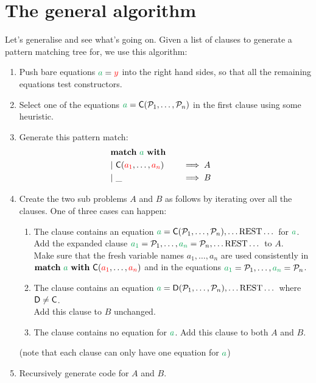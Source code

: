 \documentclass[a4paper, 11pt]{article}
\theoremstyle{definition}
\begin{document}
\section{The general algorithm}

Let's generalise and see what's going on. Given a list of clauses to generate a pattern matching tree for, we use this algorithm:

\begin{enumerate}
  \item Push bare equations $\ba = \fvar y$ into the right hand sides, so that all the remaining equations test constructors.
  \item Select one of the equations $\ba = \C(\pat_1, \dots, \pat_n)$ in the first clause using some heuristic.
  \item Generate this pattern match:
  \begin{alignat*}{4}
    \matchwith{\ba} \\
    \clause{\C(\fvar{a_1}, \dots, \fvar{a_n})}{A} \\
    \clause{\_}{B}
  \end{alignat*}
  \item Create the two sub problems $A$ and $B$ as follows by iterating over all the clauses. One of three cases can happen:
  \begin{enumerate}
    \item The clause contains an equation $\ba = \C(\pat_1, \dots, \pat_n), \dots \text{REST} \dots$ for $\ba$. \\
          Add the expanded clause $\bvar{a_1} = \pat_1, \dots, \bvar{a_n} = \pat_n, \dots \text{REST} \dots$ to $A$. \\
          Make sure that the fresh variable names $a_1,\dots,a_n$ are used consistently in \\
          $\mathbf{match}\ \ba\ \mathbf{with}\ \C(\fvar{a_1}, \dots, \fvar{a_n})$ and in the equations $\bvar{a_1} = \pat_1, \dots, \bvar{a_n} = \pat_n$.
    \item The clause contains an equation $\ba = \mathsf{D}(\pat_1, \dots, \pat_n), \dots \text{REST} \dots$ where $\mathsf{D} \neq \mathsf{\textcolor{black}{C}}$. \\
          Add this clause to $B$ unchanged.
    \item The clause contains no equation for $\ba$. Add this clause to both $A$ and $B$.
  \end{enumerate}
  (note that each clause can only have one equation for $\ba$)
  \item Recursively generate code for $A$ and $B$.
\end{enumerate}
\end{document}
